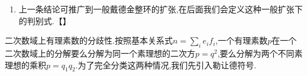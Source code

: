 \begin{enumerate}
\begin{proof}
    	现在我们证明原命题.设$\{\omega_1,\cdots,\omega_n\}$是一组$B$上的整基,设$\overline{\omega_i}$是它在$\mathrm{mod}p$下的像,那么$p\mid d(K)$当且仅当$d_{B/\mathbb{F}_p}(\overline{\omega_1},\overline{\omega_2},\cdots,\overline{\omega_n})=0$.现在注意取每个$B_i$上的一组整基可以凑出$B=\oplus_{1\le i\le g}B_i$上的一组整基,此时$B$上的判别式就是每个$B_i$上对应的判别式的乘积.于是$d_{B/\mathbb{F}_p}(\overline{\omega_1},\overline{\omega_2},\cdots,\overline{\omega_n})=0$当且仅当存在某个$i$使得$d_{B_i/\mathbb{F}_p}=0$,这等价于$q_i$是分歧的,于是等价于$p$在$K$中分歧.
    \end{proof}
    \item 上一条结论可推广到一般戴德金整环的扩张,在后面我们会定义这种一般扩张下的判别式.【】
\end{enumerate}

二次数域上有理素数的分歧性.按照基本关系式$n=\sum_ie_if_i$,一个有理素数$p$在一个二次数域上的分解要么分解为同一个素理想的二次方$p=q^2$,要么分解为两个不同素理想的乘积$p=q_1q_2$.为了完全分类这两种情况,我们先引入勒让德符号.
